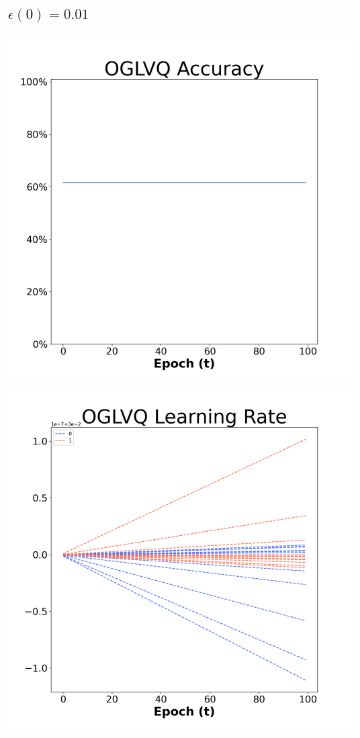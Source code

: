 \begin{figure}[H]
\begin{subfigure}{0.3\textwidth}
\caption{$\epsilon(0)=0.01$}
\end{subfigure}\hfil %
\begin{subfigure}{0.3\textwidth}
\includegraphics[width=\linewidth]{images/exper1/SP/OGLVQ_0.03_acc.png}
\includegraphics[width=\linewidth]{images/exper1/SP/OGLVQ_0.03_lr.png}

\end{subfigure}
\end{figure}
